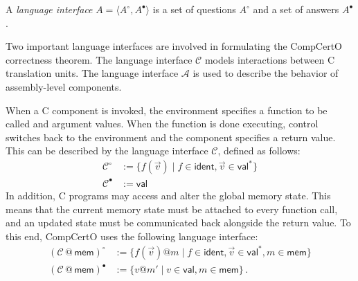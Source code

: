 \documentclass[acmsmall,screen,review,anonymous]{acmart}
\newcommand{\kw}[1]{\ensuremath{ \mathsf{#1} }}
\newcommand{\que}{\circ}
\newcommand{\ans}{\bullet}
\begin{document}
\begin{definition} \label{def:li} %
A \emph{language interface} $A = \langle A^\que, A^\ans \rangle$
is a set of questions $A^\que$ and a set of answers $A^\ans$.
\end{definition}

Two important language interfaces
are involved in formulating the CompCertO correctness theorem.
The language interface $\mathcal{C}$
models interactions between C translation units.
The language interface $\mathcal{A}$
is used to describe the behavior of assembly-level components.

\begin{example} \label{ex:langint} %
When a C component is invoked,
the environment specifies a function to be called
and argument values.
When the function is done executing,
control switches back to the environment
and the component specifies a return value.
This can be described by the language interface $\mathcal{C}$,
defined as follows:
\begin{align*}
  \mathcal{C}^\que &:= \{ f(\vec{v}) \mid f \in \kw{ident}, \vec{v} \in \kw{val}^* \}
  \\
  \mathcal{C}^\ans &:= \kw{val}
\end{align*}
In addition,
C programs may access and alter the global memory state.
This means that the current memory state must be attached
to every function call,
and an updated state must be communicated back
alongside the return value.
To this end, CompCertO uses the following language interface:
\begin{align*}
  (\mathcal{C} \mathbin@ \kw{mem})^\que &:=
    \{ f(\vec{v})@m \mid f \in \kw{ident}, \vec{v} \in \kw{val}^*, m \in \kw{mem} \}
  \\
  (\mathcal{C} \mathbin@ \kw{mem})^\ans &:=
    \{ v@m' \mid v \in \kw{val}, m \in \kw{mem} \}
  \,.
\end{align*}
\end{example}

\end{document}
